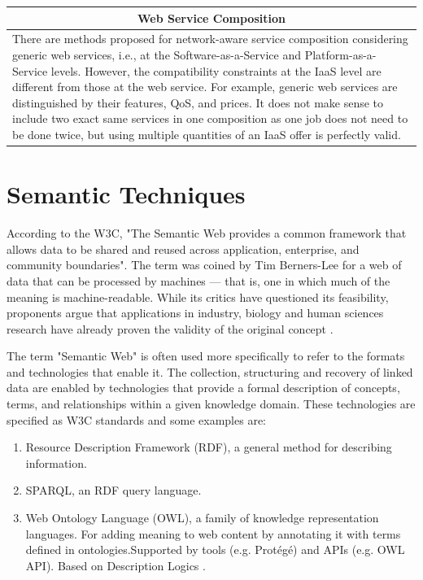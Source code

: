 \begin{longtable}{ p{30mm} | p{50mm} | p{50mm} }
\hline
\multicolumn{3}{c}{ \cellcolor{yellow} Web Service Composition}\\
\hline
\multicolumn{3}{p{140mm}}{There are methods proposed for network-aware service composition
\cite{Yu2007, Benatallah2004, Zheng2013}
considering generic web services, i.e., at the
Software-as-a-Service and Platform-as-a-Service levels. However,
the compatibility constraints at the IaaS level are different
from those at the web service. For example, generic web
services are distinguished by their features, QoS, and prices.
It does not make sense to include two exact same services in
one composition as one job does not need to be done twice, but
using multiple quantities of an IaaS offer is perfectly valid.}\\
\hline
\end{longtable}

\section{Semantic Techniques}
\label{sec:semantic_web}
According to the W3C, "The Semantic Web provides a common framework that allows data to be shared and reused across application, enterprise, and community boundaries". The term was coined by Tim Berners-Lee for a web of data that can be processed by machines — that is, one in which much of the meaning is machine-readable. While its critics have questioned its feasibility, proponents argue that applications in industry, biology and human sciences research have already proven the validity of the original concept \cite{SemanticWeb}.

The term "Semantic Web" is often used more specifically to refer to the formats and technologies that enable it. The collection, structuring and recovery of linked data are enabled by technologies that provide a formal description of concepts, terms, and relationships within a given knowledge domain. These technologies are specified as W3C standards and some examples are:

\begin{enumerate}
    \item 
    Resource Description Framework (RDF), a general method for describing information.
    \item
    SPARQL, an RDF query language.
    \item
    Web Ontology Language (OWL), a family of knowledge representation languages. For adding meaning to web content by annotating it with terms defined in ontologies.Supported by tools (e.g. Protégé) and APIs (e.g. OWL API). Based on Description Logics \cite{OntologyLanguageTool2}.
\end{enumerate}

